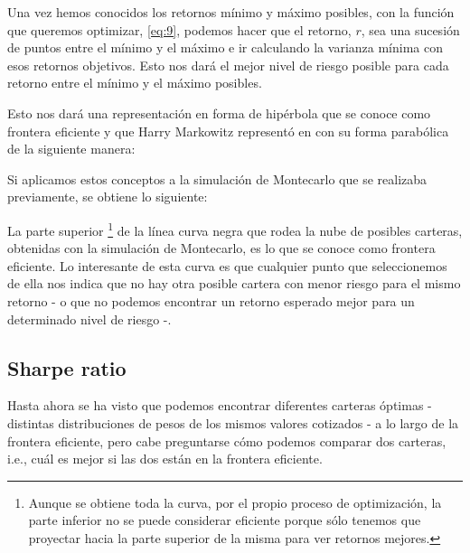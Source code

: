 Una vez hemos conocidos los retornos mínimo y máximo posibles, con la función que queremos optimizar, \ref{eq:9}, podemos hacer que el retorno, $r$, sea una sucesión de puntos entre el mínimo y el máximo e ir calculando la varianza mínima con esos retornos objetivos. Esto nos dará el mejor nivel de riesgo posible para cada retorno entre el mínimo y el máximo posibles. 

Esto nos dará una representación en forma de hipérbola que se conoce como frontera eficiente \citep{wiki:frontera_eficiente} y que Harry Markowitz representó en \citep{book:Portfolio_selection} con su forma parabólica de la siguiente manera:


Si aplicamos estos conceptos a la simulación de Montecarlo que se realizaba previamente, se obtiene lo siguiente:


La parte superior \footnote{Aunque se obtiene toda la curva, por el propio proceso de optimización, la parte inferior no se puede considerar eficiente porque sólo tenemos que proyectar hacia la parte superior de la misma para ver retornos mejores.} de la línea curva negra que rodea la nube de posibles carteras, obtenidas con la simulación de Montecarlo, es lo que se conoce como frontera eficiente. Lo interesante de esta curva es que cualquier punto que seleccionemos de ella nos indica que no hay otra posible cartera con menor riesgo para el mismo retorno - o que no podemos encontrar un retorno esperado mejor para un determinado nivel de riesgo -.


\subsection{Sharpe ratio}

Hasta ahora se ha visto que podemos encontrar diferentes carteras óptimas - distintas distribuciones de pesos de los mismos valores cotizados - a lo largo de la frontera eficiente, pero cabe preguntarse cómo podemos comparar dos carteras, i.e., cuál es mejor si las dos están en la frontera eficiente. 

